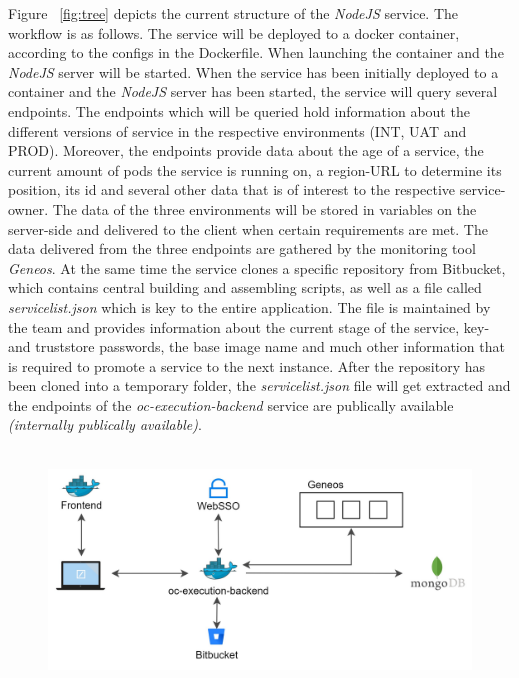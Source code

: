 \documentclass[a4paper,twoside,11pt, pagesize]{scrartcl}
\begin{document}
\begin{spacing}{1.2}
Figure ~\ref{fig:tree} depicts the current structure of the \textit{NodeJS} service. The workflow is as follows. The service will be deployed to a docker container, according to the configs in the Dockerfile. When launching the container and the \textit{NodeJS} server will be started. When the service has been initially deployed to a container and the \textit{NodeJS} server has been started, the service will query several endpoints. The endpoints which will be queried hold information about the different versions of service in the respective environments (INT, UAT and PROD). Moreover, the endpoints provide data about the age of a service, the current amount of pods the service is running on, a region-URL to determine its position, its id and several other data that is of interest to the respective service-owner. The data of the three environments will be stored in variables on the server-side and delivered to the client when certain requirements are met. The data delivered from the three endpoints are gathered by the monitoring tool \textit{Geneos}. At the same time the service clones a specific repository from Bitbucket, which contains central building and assembling scripts, as well as a file called \textit{servicelist.json} which is key to the entire application. The file is maintained by the team and provides information about the current stage of the service, key- and truststore passwords, the base image name and much other information that is required to promote a service to the next instance. After the repository has been cloned into a temporary folder, the \textit{servicelist.json} file will get extracted and the endpoints of the \textit{oc-execution-backend} service are publically available \textit{(internally publically available)}.\\\\ 
\begin{figure}[H]
\label{fig:oc}
\centering
\includegraphics[width=1\textwidth]{oc.jpg}

\end{figure}
\end{spacing}
\end{document}
